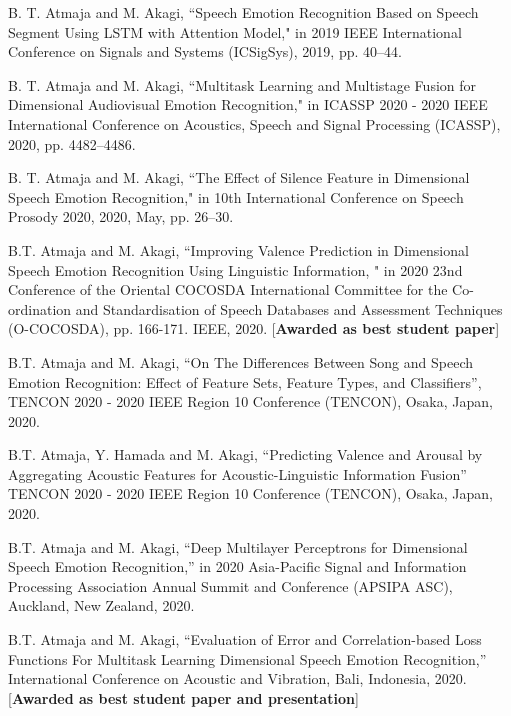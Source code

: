 \begin{publication}
\item
B. T. Atmaja and M. Akagi, ``Speech Emotion Recognition Based on Speech Segment
Using LSTM with Attention Model," in 2019 IEEE International Conference on
Signals and Systems (ICSigSys), 2019, pp. 40--44.

\item
B. T. Atmaja and M. Akagi, ``Multitask Learning and Multistage Fusion for Dimensional Audiovisual Emotion Recognition," in ICASSP 2020 - 2020 IEEE International Conference on Acoustics, Speech and Signal Processing (ICASSP), 2020, pp. 4482--4486.

\item
B. T. Atmaja and M. Akagi, ``The Effect of Silence Feature in Dimensional
Speech Emotion Recognition," in 10th International Conference on Speech Prosody
2020, 2020, May, pp. 26--30.

\item
B.T. Atmaja and M. Akagi, ``Improving Valence Prediction in
Dimensional Speech Emotion Recognition Using Linguistic Information, " in 2020
23nd Conference of the Oriental COCOSDA International Committee for the
Co-ordination and Standardisation of Speech Databases and Assessment Techniques
(O-COCOSDA), pp. 166-171. IEEE, 2020. [\textbf{Awarded as best student paper}]

\item
B.T. Atmaja and M. Akagi, ``On The Differences Between Song and Speech Emotion
Recognition: Effect of Feature Sets, Feature Types, and Classifiers'', TENCON
2020 - 2020 IEEE Region 10 Conference (TENCON), Osaka, Japan, 2020.

\item
B.T. Atmaja, Y. Hamada  and M. Akagi, ``Predicting Valence and Arousal by Aggregating Acoustic Features for Acoustic-Linguistic Information Fusion''
TENCON 2020 - 2020 IEEE Region 10 Conference (TENCON), Osaka, Japan, 2020. 

\item 
B.T. Atmaja and M. Akagi, ``Deep Multilayer Perceptrons for Dimensional Speech
Emotion Recognition,'' in 2020 Asia-Pacific Signal and Information Processing
Association Annual Summit and Conference (APSIPA ASC), Auckland, New Zealand,
2020.

\item 
B.T. Atmaja and M. Akagi, ``Evaluation of Error and Correlation-based Loss
Functions For Multitask Learning Dimensional Speech Emotion Recognition,''
International Conference on Acoustic and Vibration, Bali, Indonesia, 2020.
[\textbf{Awarded as best student paper and presentation}]\\


\end{publication}
